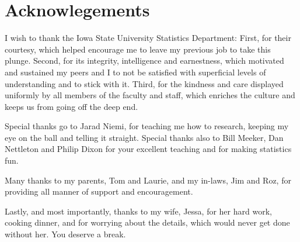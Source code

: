 \section*{Acknowlegements}
I wish to thank the Iowa State University Statistics Department: First, for their courtesy, which helped encourage me to leave my previous job to take this plunge. Second, for its integrity, intelligence and earnestness, which motivated and sustained my peers and I to not be satisfied with superficial levels of understanding and to stick with it. Third, for the kindness and care displayed uniformly by all members of the faculty and staff, which enriches the culture and keeps us from going off the deep end.

Special thanks go to Jarad Niemi, for teaching me how to research, keeping my eye on the ball and telling it straight. Special thanks also to Bill Meeker, Dan Nettleton and Philip Dixon for your excellent teaching and for making statistics fun.

Many thanks to my parents, Tom and Laurie, and my in-laws, Jim and Roz, for providing all manner of support and encouragement.

Lastly, and most importantly, thanks to my wife, Jessa, for her hard work, cooking dinner, and for worrying about the details, which would never get done without her. You deserve a break.
